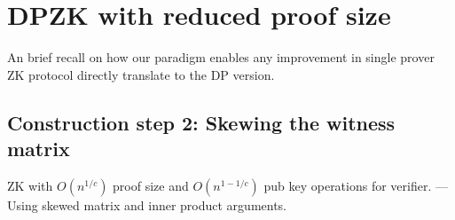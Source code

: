 \section{DPZK with reduced proof size}
An brief recall on how our paradigm enables any improvement in single prover ZK protocol directly translate to the DP version.

\subsection{Construction step 2: Skewing the witness matrix}
 ZK with $O(n^{1/c})$ proof size and $O(n^{1-1/c})$ pub key operations for
verifier.
 --- Using skewed matrix and inner product arguments.
